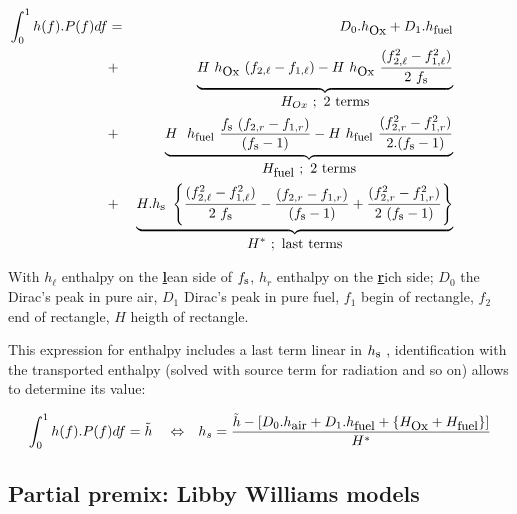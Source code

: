 \begin{eqnarray}
\int_{0}^1 h(f) . P(f) df &=& D_0.h_{\mbox{\small Ox}} + D_1.h_{\mbox{\footnotesize fuel}} \qquad\qquad\nonumber \\
                          &+& \underbrace{H ~ h_{\mbox{\small Ox}} ~ (f_{2,\ell}-f_{1,\ell})
                           -  H ~ h_{\mbox{\small Ox}}
\displaystyle{     ~\frac{(f_{2,\ell}^2-f_{1,\ell}^2)}{2~f_{\mbox{\footnotesize s}}} } }_{\displaystyle H_{\small Ox}~;~\mbox{2 terms}}\qquad\qquad\nonumber \\
                          &+& \underbrace{H ~ ~h_{\mbox{\footnotesize fuel}} ~\frac{ f_{\mbox{\footnotesize s}}
                                              ~(f_{2,r}-f_{1,r}) }{ (f_{\mbox{\footnotesize s}}-1) }
                            - H ~ h_{\mbox{\footnotesize fuel}} ~ \displaystyle{\frac{(f_{2,r}^2-f_{1,r}^2)}{2.(f_{\mbox{\footnotesize s}}-1)} } }_{   \displaystyle H_{\mbox{\small fuel}}~;~\mbox{2 terms} }\qquad\qquad \\
                          &+& \underbrace{ H . h_{\mbox{\footnotesize s}} ~
\displaystyle \left\{ \frac{(f_{2,\ell}^2-f_{1,\ell}^2)}{2~f_{\mbox{\footnotesize s}}}
                -\frac{(f_{2,r}-f_{1,r})          }{(f_{\mbox{\footnotesize s}}-1)}
                +\frac{(f_{2,r}^2-f_{1,r}^2)}{2~(f_{\mbox{\footnotesize s}}-1)} \right\} }_{\displaystyle H^{*}~;~\mbox{last terms}} \qquad\qquad\nonumber
\end{eqnarray}

With $h_{\ell}$ enthalpy on the \underline{\bf l}ean side of
$f_{\mbox{\footnotesize s}}$, $h_{r}$ enthalpy on the \underline{\bf r}ich side; $D_0$ the Dirac's peak in pure air, $D_1$ Dirac's peak in
pure fuel, $f_1$ begin of rectangle, $f_2$ end of rectangle, $H$ heigth of rectangle.

This expression for enthalpy includes a last term linear in
$h_{\mbox{\footnotesize s}}$ , identification with the transported enthalpy
(solved with source term for radiation and so on) allows to determine its value:

\begin{eqnarray}
\int_{0}^1 h(f) . P(f) df =\tilde{h} \quad  \Leftrightarrow &&
                    h_{s} =\frac{\tilde{h}- [ D_0.h_{\mbox{\small air}} + D_1.h_{\mbox{\small fuel}}+\{ H_{\mbox{\small Ox}} + H_{\mbox{\small fuel}}\} ]}{H^{*}}
\end{eqnarray}

\subsection{Partial premix: Libby Williams models}

